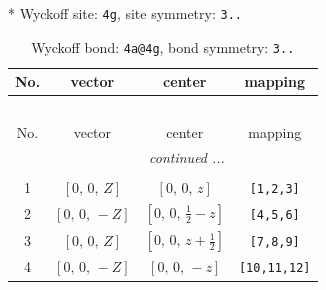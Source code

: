 \documentclass[fleqn,8pt]{jsarticle}
\begin{document}
* Wyckoff site: {\tt 4g}, site symmetry: {\tt 3..}
\renewcommand{\arraystretch}{1.2}
\begin{longtable}{cccc}
\caption{Wyckoff bond: {\tt 4a@4g}, bond symmetry: {\tt 3..}}
 \\
 \hline \hline
No. & vector & center & mapping \\ \hline \endfirsthead

\multicolumn{3}{l}{\tablename\ \thetable{}} \\
 \hline \hline
No. & vector & center & mapping \\ \hline \endhead

 \hline \hline
\multicolumn{3}{r}{\footnotesize\it continued ...} \\ \endfoot

 \hline \hline
\multicolumn{3}{r}{} \\ \endlastfoot

1 & $\left[ 0,\, 0,\, Z \right]$ & $\left[ 0,\, 0,\, z \right]$ & {\tt [1,2,3]} \\ \hline
2 & $\left[ 0,\, 0,\, - Z \right]$ & $\left[ 0,\, 0,\, \frac{1}{2} - z \right]$ & {\tt [4,5,6]} \\ \hline
3 & $\left[ 0,\, 0,\, Z \right]$ & $\left[ 0,\, 0,\, z + \frac{1}{2} \right]$ & {\tt [7,8,9]} \\ \hline
4 & $\left[ 0,\, 0,\, - Z \right]$ & $\left[ 0,\, 0,\, - z \right]$ & {\tt [10,11,12]} \\
\end{longtable}
\renewcommand{\arraystretch}{1.2}
\end{document}
